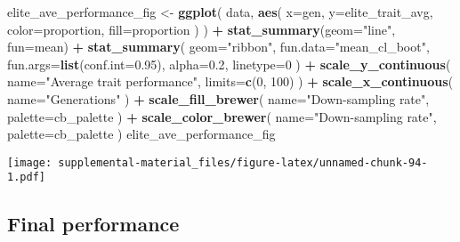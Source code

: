 \documentclass[]{book}
\newenvironment{Shaded}{\begin{snugshade}}{\end{snugshade}}
\newcommand{\DataTypeTok}[1]{\textcolor[rgb]{0.13,0.29,0.53}{#1}}
\newcommand{\DecValTok}[1]{\textcolor[rgb]{0.00,0.00,0.81}{#1}}
\newcommand{\FloatTok}[1]{\textcolor[rgb]{0.00,0.00,0.81}{#1}}
\newcommand{\KeywordTok}[1]{\textcolor[rgb]{0.13,0.29,0.53}{\textbf{#1}}}
\newcommand{\NormalTok}[1]{#1}
\newcommand{\OperatorTok}[1]{\textcolor[rgb]{0.81,0.36,0.00}{\textbf{#1}}}
\newcommand{\StringTok}[1]{\textcolor[rgb]{0.31,0.60,0.02}{#1}}
\begin{document}
\begin{Shaded}
\begin{Highlighting}[]
\NormalTok{elite_ave_performance_fig <-}
\StringTok{  }\KeywordTok{ggplot}\NormalTok{(}
\NormalTok{    data,}
    \KeywordTok{aes}\NormalTok{(}
      \DataTypeTok{x=}\NormalTok{gen,}
      \DataTypeTok{y=}\NormalTok{elite_trait_avg,}
      \DataTypeTok{color=}\NormalTok{proportion,}
      \DataTypeTok{fill=}\NormalTok{proportion}
\NormalTok{    )}
\NormalTok{  ) }\OperatorTok{+}
\StringTok{  }\KeywordTok{stat_summary}\NormalTok{(}\DataTypeTok{geom=}\StringTok{"line"}\NormalTok{, }\DataTypeTok{fun=}\NormalTok{mean) }\OperatorTok{+}
\StringTok{  }\KeywordTok{stat_summary}\NormalTok{(}
    \DataTypeTok{geom=}\StringTok{"ribbon"}\NormalTok{,}
    \DataTypeTok{fun.data=}\StringTok{"mean_cl_boot"}\NormalTok{,}
    \DataTypeTok{fun.args=}\KeywordTok{list}\NormalTok{(}\DataTypeTok{conf.int=}\FloatTok{0.95}\NormalTok{),}
    \DataTypeTok{alpha=}\FloatTok{0.2}\NormalTok{,}
    \DataTypeTok{linetype=}\DecValTok{0}
\NormalTok{  ) }\OperatorTok{+}
\StringTok{  }\KeywordTok{scale_y_continuous}\NormalTok{(}
    \DataTypeTok{name=}\StringTok{"Average trait performance"}\NormalTok{,}
    \DataTypeTok{limits=}\KeywordTok{c}\NormalTok{(}\DecValTok{0}\NormalTok{, }\DecValTok{100}\NormalTok{)}
\NormalTok{  ) }\OperatorTok{+}
\StringTok{  }\KeywordTok{scale_x_continuous}\NormalTok{(}
    \DataTypeTok{name=}\StringTok{"Generations"}
\NormalTok{  ) }\OperatorTok{+}
\StringTok{  }\KeywordTok{scale_fill_brewer}\NormalTok{(}
    \DataTypeTok{name=}\StringTok{"Down-sampling rate"}\NormalTok{,}
    \DataTypeTok{palette=}\NormalTok{cb_palette}
\NormalTok{  ) }\OperatorTok{+}
\StringTok{  }\KeywordTok{scale_color_brewer}\NormalTok{(}
    \DataTypeTok{name=}\StringTok{"Down-sampling rate"}\NormalTok{,}
    \DataTypeTok{palette=}\NormalTok{cb_palette}
\NormalTok{  )}
\NormalTok{elite_ave_performance_fig}
\end{Highlighting}
\end{Shaded}

\texttt{[image: supplemental-material\_files/figure-latex/unnamed-chunk-94-1.pdf]}

\hypertarget{final-performance-8}{%
\subsection{Final performance}\label{final-performance-8}}
\end{document}
